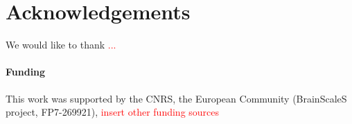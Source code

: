 \documentclass{frontiers}
\newcommand{\missing}[1]{\textcolor{red}{#1}}
\begin{document}
\section*{Acknowledgements}
We would like to thank \missing{...}

\paragraph{Funding\textcolon} This work was supported by the CNRS, the European Community (BrainScaleS project, FP7-269921), \missing{insert other funding sources}



\end{document}
